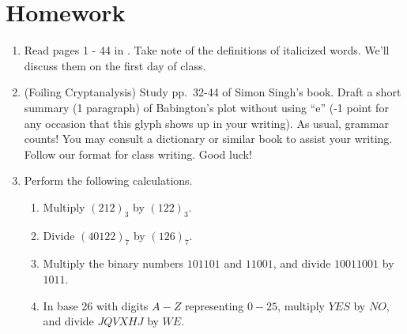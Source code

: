 \section{Homework}

\begin{enumerate}
\item Read pages 1 - 44 in \cite{Singh}.  Take note of the definitions of italicized words.  We'll discuss them on the first day of class.

\item (Foiling Cryptanalysis) Study pp.\ 32-44 of Simon Singh's book.  Draft a short summary (1 paragraph) of Babington's plot without using ``e'' (-1 point for any occasion that this glyph shows up in your writing). As usual, grammar counts! You may consult a dictionary or similar book to assist your writing.  Follow our format for class writing.  Good luck!
\item Perform the following calculations.
\begin{enumerate}
\item Multiply $(212)_3$ by $(122)_3$.
\item Divide $(40122)_7$ by $(126)_7$.
\item Multiply the binary numbers $101101$ and $11001$, and divide $10011001$ by $1011$.
\item In base 26 with digits $A - Z$ representing $0 - 25$, multiply $YES$ by $NO$, and divide $JQVXHJ$ by $WE$.
\end{enumerate}
\end{enumerate}


